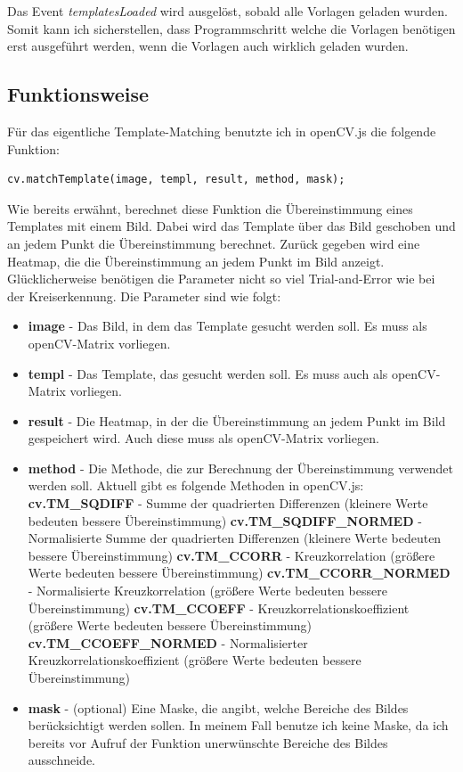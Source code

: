 Das Event \textit{templatesLoaded} wird ausgelöst, sobald alle Vorlagen geladen wurden. Somit kann ich sicherstellen, dass Programmschritt welche die Vorlagen benötigen erst ausgeführt werden, wenn die Vorlagen auch wirklich geladen wurden.
\subsection{Funktionsweise}
Für das eigentliche Template-Matching benutzte ich in openCV.js die folgende Funktion:
\begin{lstlisting}[style=JavaScript]
cv.matchTemplate(image, templ, result, method, mask);
\end{lstlisting}

Wie bereits erwähnt, berechnet diese Funktion die Übereinstimmung eines Templates mit einem Bild. Dabei wird das Template über das Bild geschoben und an jedem Punkt die Übereinstimmung berechnet. Zurück gegeben wird eine Heatmap, die die Übereinstimmung an jedem Punkt im Bild anzeigt. Glücklicherweise benötigen die Parameter nicht so viel Trial-and-Error wie bei der Kreiserkennung. Die Parameter sind wie folgt:
\begin{itemize}
    \item \textbf{image} - Das Bild, in dem das Template gesucht werden soll. Es muss als openCV-Matrix vorliegen.
    \item \textbf{templ} - Das Template, das gesucht werden soll. Es muss auch als openCV-Matrix vorliegen.
    \item \textbf{result} - Die Heatmap, in der die Übereinstimmung an jedem Punkt im Bild gespeichert wird. Auch diese muss als openCV-Matrix vorliegen.
    \item \textbf{method} - Die Methode, die zur Berechnung der Übereinstimmung verwendet werden soll. Aktuell gibt es folgende Methoden in openCV.js:
    \subitem \textbf{cv.TM\_SQDIFF} - Summe der quadrierten Differenzen (kleinere Werte bedeuten bessere Übereinstimmung)
    \subitem \textbf{cv.TM\_SQDIFF\_NORMED} - Normalisierte Summe der quadrierten Differenzen (kleinere Werte bedeuten bessere Übereinstimmung)
    \subitem \textbf{cv.TM\_CCORR} - Kreuzkorrelation (größere Werte bedeuten bessere Übereinstimmung)
    \subitem \textbf{cv.TM\_CCORR\_NORMED} - Normalisierte Kreuzkorrelation (größere Werte bedeuten bessere Übereinstimmung)
    \subitem \textbf{cv.TM\_CCOEFF} - Kreuzkorrelationskoeffizient (größere Werte bedeuten bessere Übereinstimmung)
    \subitem \textbf{cv.TM\_CCOEFF\_NORMED} - Normalisierter Kreuzkorrelationskoeffizient (größere Werte bedeuten bessere Übereinstimmung)
    \item \textbf{mask} - (optional) Eine Maske, die angibt, welche Bereiche des Bildes berücksichtigt werden sollen. In meinem Fall benutze ich keine Maske, da ich bereits vor Aufruf der Funktion unerwünschte Bereiche des Bildes ausschneide.
\end{itemize}

